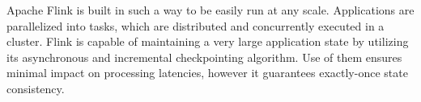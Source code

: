 Apache Flink is built in such a way to be easily run at any scale. Applications are parallelized into tasks,
which are distributed and concurrently executed in a cluster.
Flink is capable of maintaining a very large application state by utilizing its asynchronous and incremental checkpointing algorithm.
Use of them ensures minimal impact on processing latencies, however it guarantees exactly-once state consistency.\cite{flink}
